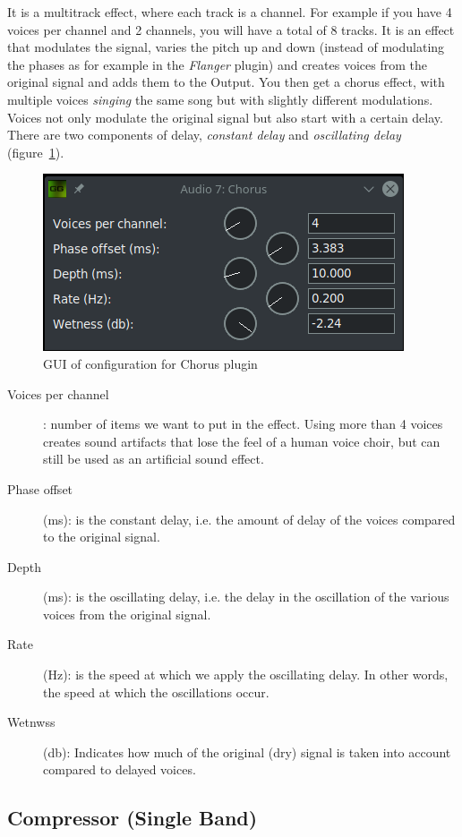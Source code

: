 It is a multitrack effect, where each track is a channel. For example if you have 4 voices per channel and 2 channels, you will have a total of 8 tracks.
It is an effect that modulates the signal, varies the pitch up and down (instead of modulating the phases as for example in the \textit{Flanger} plugin) and creates voices from the original signal and adds them to the Output. You then get a chorus effect, with multiple voices \textit{singing} the same song but with slightly different modulations. Voices not only modulate the original signal but also start with a certain delay. There are two components of delay, \textit{constant delay} and \textit{oscillating delay} (figure~\ref{fig:chorus}).

\begin{figure}[htpb]
	\centering
	\includegraphics[width=0.5\linewidth]{images/chorus.png}
	\caption{GUI of configuration for Chorus plugin}
	\label{fig:chorus}
\end{figure}

\begin{description}
	\item[Voices per channel]: number of items we want to put in the effect. Using more than 4 voices creates sound artifacts that lose the feel of a human voice choir, but can still be used as an artificial sound effect.
	\item[Phase offset] (ms): is the constant delay, i.e. the amount of delay of the voices compared to the original signal.
	\item[Depth] (ms): is the oscillating delay, i.e. the delay in the oscillation of the various voices from the original signal.
	\item[Rate] (Hz): is the speed at which we apply the oscillating delay. In other words, the speed at which the oscillations occur.
	\item[Wetnwss] (db): Indicates how much of the original (dry) signal is taken into account compared to delayed voices.
\end{description}

\subsection{Compressor (Single Band)}%
\label{sub:compressor}


